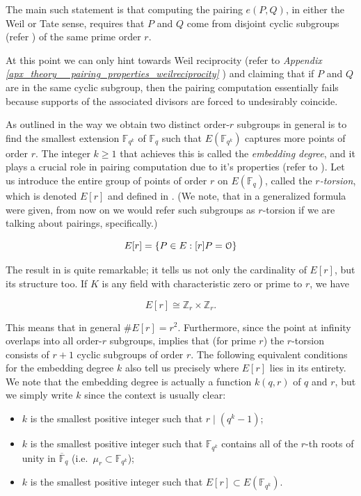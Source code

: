 The main such statement is that computing the pairing
$e(P, Q)$, in either the Weil or Tate sense, requires that $P$ and $Q$ come
from disjoint cyclic subgroups (refer ) of the same prime order $r$. 

At this point we can only hint towards Weil reciprocity (refer to \textit{Appendix \ref{apx_theory__pairing_properties_weilreciprocity}} ) and claiming that if $P$ and $Q$ are in the same cyclic subgroup, then the pairing computation essentially fails because supports of the associated divisors are forced to undesirably coincide.




As outlined in  the way we obtain two distinct order-$r$ subgroups
in general is  to find the smallest extension $\mathbb{F}_{q^k}$ of $\mathbb{F}_q$
such that $E(\mathbb{F}_{q^k})$ captures more points of order $r$. The integer
$k \geq 1$ that achieves this is called the \emph{embedding degree}, and it
plays a crucial role in pairing computation due to it's properties (refer to ).  Let us introduce the entire group of points of order $r$ on $E(\mathbb{F}_q)$, called the \emph{$r$-torsion}, which is denoted $E[r]$ and defined in . (We note, that in  a generalized formula were given, from now on we would refer such subgroups as $r$-torsion if we are talking about pairings, specifically.)

\begin{equation}
	E[r] = \{ P \in E : [r]P = \EuScript{O} \}
	\label{eq:rtorsion}
\end{equation}

The result in  is quite remarkable; it tells us not only the cardinality
of $E[r]$, but its structure too. If $K$ is any field with characteristic zero
or prime to $r$, we have

\begin{equation}\label{eq:torsion-structure}
	E[r] \cong \mathbb{Z}_r \times \mathbb{Z}_r.
\end{equation}

This means that in general $\#E[r] = r^2$. Furthermore, since the point at
infinity overlaps into all order-$r$ subgroups,
 implies that (for prime $r$) the
$r$-torsion consists of $r + 1$ cyclic subgroups of order $r$. The following
equivalent conditions for the embedding degree $k$ also tell us precisely where
$E[r]$ lies in its entirety. We note that the embedding degree is actually a
function $k(q, r)$ of $q$ and $r$, but we simply write $k$ since the context
is usually clear:
\begin{itemize}
	\item $k$ is the smallest positive integer such that $r \mid (q^k - 1)$;
	\item $k$ is the smallest positive integer such that $\mathbb{F}_{q^k}$
	contains all of the $r$-th roots of unity in $\overline{\mathbb{F}}_q$
	(i.e.\ $\mu_r \subset \mathbb{F}_{q^k}$);
	\item $k$ is the smallest positive integer such that
	$E[r] \subset E(\mathbb{F}_{q^k})$.
\end{itemize}

